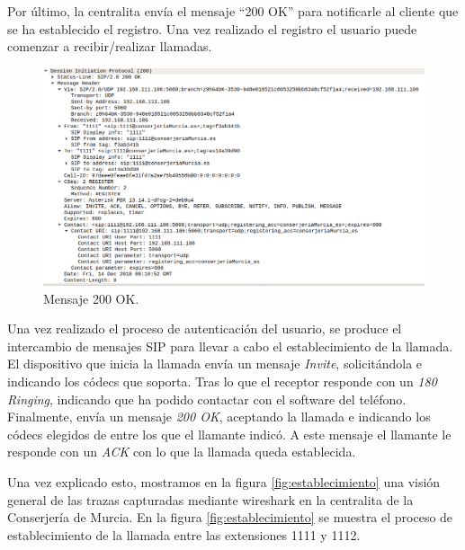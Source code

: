 \documentclass[a4paper]{article}
\begin{document}
\newpage
 Por último, la centralita envía el mensaje ``200 OK'' para notificarle al cliente que se ha establecido el registro. Una vez realizado el registro el usuario puede comenzar a recibir/realizar llamadas.

\begin{figure}[htb]
    \begin{center}
        \includegraphics[width=1\textwidth]{200OK.png}
         \caption{Mensaje 200 OK.}
         \label{fig:reg2}
    \end{center}
\end{figure}

 Una vez realizado el proceso de autenticación del usuario, se produce el intercambio de mensajes SIP para llevar a cabo el establecimiento de la llamada. El dispositivo que inicia la llamada envía un mensaje \textit{Invite}, solicitándola e indicando los códecs que soporta. Tras lo que el receptor responde con un \textit{180 Ringing}, indicando que ha podido contactar con el software del teléfono. Finalmente, envía un mensaje \textit{200 OK}, aceptando la llamada e indicando los códecs elegidos de entre los que el llamante indicó. A este mensaje el llamante le responde con un \textit{ACK} con lo que la llamada queda establecida. 

  Una vez explicado esto, mostramos en la figura \ref{fig:establecimiento} una visión general de las trazas capturadas mediante wireshark en la centralita de la Conserjería de Murcia. En la figura \ref{fig:establecimiento} se muestra el proceso de establecimiento de la llamada entre las extensiones 1111 y 1112.
\end{document}
